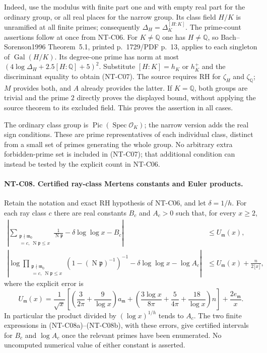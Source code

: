Indeed, use the modulus with finite part one and with empty real
part for the ordinary group, or all real places for the narrow
group.  Its class field $H/K$ is unramified at all finite primes;
consequently $\Delta_H=\Delta_K^{[H:K]}$.
The prime-count assertions follow at once from NT-C06.
For $K\ne\mathbb Q$ one has $H\ne\mathbb Q$, so
Bach--Sorenson1996 Theorem~5.1, printed p.~1729/PDF p.~13,
applies to each singleton of $\operatorname{Gal}(H/K)$.
Its degree-one prime has norm at most
$(4\log\Delta_H+2.5[H:\mathbb Q]+5)^2$.
Substitute $[H:K]=h_K$ or $h_K^+$ and the discriminant equality
to obtain (NT-C07).  The source requires RH for $\zeta_H$
and $\zeta_{\mathbb Q}$; $M$ provides both, and $A$ already
provides the latter.  If $K=\mathbb Q$, both groups are trivial
and the prime $2$ directly proves the displayed bound, without
applying the source theorem to its excluded field.
This proves the assertion in all cases.

The ordinary class group is
$\operatorname{Pic}(\operatorname{Spec}\mathcal O_K)$; the narrow
version adds the real sign conditions.  These are prime
representatives of each individual class, distinct from a small
set of primes generating the whole group.  No arbitrary extra
forbidden-prime set is included in (NT-C07); that additional
condition can instead be tested by the explicit count in NT-C06.

\paragraph{NT-C08. Certified ray-class Mertens constants and Euler products.}
Retain the notation and exact RH hypothesis of NT-C06, and let
$\delta=1/h$.  For each ray class $c$ there are real constants
$B_c$ and $A_c>0$ such that, for every $x\ge2$,
\begin{align*}
 \left|\sum_{\substack{\mathfrak p\nmid\mathfrak m_0\\
          [\mathfrak p]=c,\ \operatorname N\mathfrak p\le x}}
        \frac1{\operatorname N\mathfrak p}
        -\delta\log\log x-B_c\right|
       &\le U_{\mathfrak m}(x),                       \tag{NT-C08a}\\
 \left|\log\prod_{\substack{\mathfrak p\nmid\mathfrak m_0\\
          [\mathfrak p]=c,\ \operatorname N\mathfrak p\le x}}
       (1-(\operatorname N\mathfrak p)^{-1})^{-1}
       -\delta\log\log x-\log A_c\right|
       &\le U_{\mathfrak m}(x)+\frac{n}{2\lfloor x\rfloor},
                                                        \tag{NT-C08b}
\end{align*}
where the explicit error is
\[
 U_{\mathfrak m}(x)=\frac1{\sqrt x}
 \left[
   \left(\frac3{2\pi}+\frac9{\log x}\right)a_{\mathfrak m}
   +\left(\frac{3\log x}{8\pi}+\frac5{4\pi}
                    +\frac{18}{\log x}\right)n\right]
       +\frac{2e_{\mathfrak m}}x.
\tag{NT-C08-error}
\]
In particular the product divided by $(\log x)^{1/h}$ tends
to $A_c$.  The two finite expressions in (NT-C08a)--(NT-C08b),
with these errors, give certified intervals for $B_c$ and
$\log A_c$ once the relevant primes have been enumerated.
No uncomputed numerical value of either constant is asserted.

